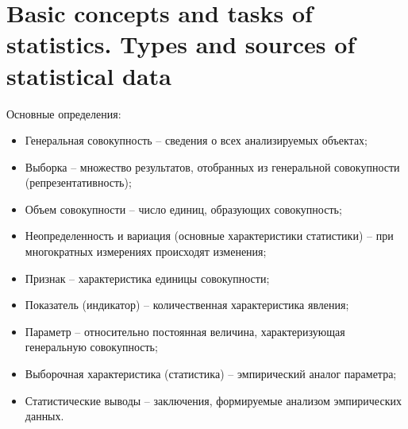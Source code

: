     \section{Basic concepts and tasks of statistics. Types and sources of statistical data}
    Основные определения:
    \begin{itemize}
        \item Генеральная совокупность -- сведения о всех анализируемых объектах;
        \item Выборка -- множество результатов, отобранных из генеральной совокупности (репрезентативность);
        \item Объем совокупности -- число единиц, образующих совокупность;
        \item Неопределенность и вариация (основные характеристики статистики) -- при многократных измерениях происходят изменения;
        \item Признак -- характеристика единицы совокупности;
        \item Показатель (индикатор) -- количественная характеристика явления;
        \item Параметр -- относительно постоянная величина, характеризующая генеральную совокупность;
        \item Выборочная характеристика (статистика) -- эмпирический аналог параметра;
        \item Статистические выводы -- заключения, формируемые анализом эмпирических данных.
    \end{itemize}
